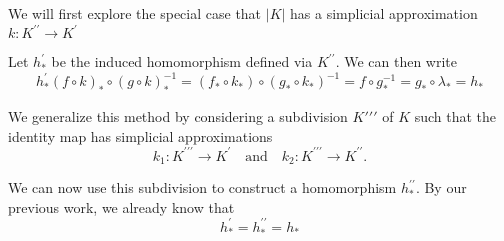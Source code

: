 \documentclass[toc=bib, headinclude]{scrartcl}
\theoremstyle{plain}
\theoremstyle{definition}
\theoremstyle{remark}
\newcommand{\pprime}{{\prime\prime}}
\newcommand{\ppprime}{{\pprime\prime}}
\newcommand{\qandq}{\quad \text{and} \quad}
\begin{document}
We will first explore the special case that $|K|$ has a simplicial approximation $k: K^\pprime\to K^\prime$

\begin{center}
	
\end{center}

Let $h_\ast^\prime$ be the induced homomorphism defined via $K^\pprime$. We can then write
\[
h_\ast^\prime(f\circ k)_\ast\circ(g\circ k)_\ast^{-1}=(f_\ast\circ k_\ast)\circ(g_\ast\circ k_\ast)^{-1}=f\circ g_\ast^{-1}=g_\ast\circ\lambda_\ast=h_\ast
\]

We generalize this method by considering a subdivision $K\ppprime$ of $K$ such that the identity map has simplicial approximations
\[
k_1: K^\ppprime\to K^\prime\qandq k_2: K^\ppprime\to K^\pprime.
\]

We can now use this subdivision to construct a homomorphism $h_\ast^\pprime$. By our previous work, we already know that 
\[
h_\ast^\prime=h_\ast^\pprime=h_\ast
\]
\end{document}

